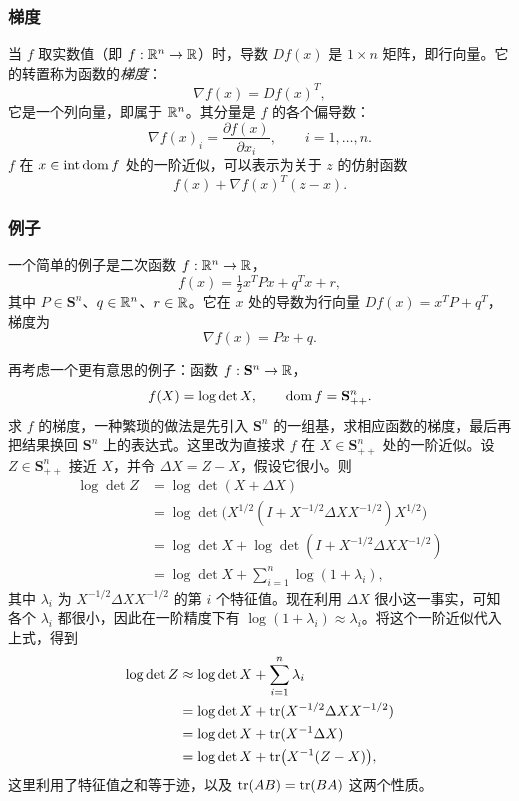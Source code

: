 \subsubsection*{梯度}
当 $f$ 取实数值（即 $f:\mathbb R^n\to\mathbb R$）时，导数 $Df(x)$ 是 $1\times n$ 矩阵，即行向量。它的转置称为函数的\emph{梯度}：
\[
 \nabla f(x)=Df(x)^T,
\]
它是一个列向量，即属于 $\mathbb R^n$。其分量是 $f$ 的各个偏导数：
\[
 \nabla f(x)_i=\frac{\partial f(x)}{\partial x_i},\qquad i=1,\ldots,n.
\]
$f$ 在 $x\in\operatorname{int}\operatorname{dom} f$ 处的一阶近似，可以表示为关于 $z$ 的仿射函数
\[
 f(x)+\nabla f(x)^T(z-x).
\]

\subsubsection*{例子}
一个简单的例子是二次函数 $f:\mathbb R^n\to\mathbb R$，
\[
 f(x)=\tfrac12x^TPx+q^Tx+r,
\]
其中 $P\in\mathbf S^n$、$q\in\mathbb R^n$、$r\in\mathbb R$。它在 $x$ 处的导数为行向量 $Df(x)=x^TP+q^T$，梯度为
\[
 \nabla f(x)=Px+q.
\]

再考虑一个更有意思的例子：函数 $f:\mathbf S^n\to\mathbb R$，
\[
 f(X)=\log\det X,\qquad\operatorname{dom} f=\mathbf S_{++}^n.
\]
求 $f$ 的梯度，一种繁琐的做法是先引入 $\mathbf S^n$ 的一组基，求相应函数的梯度，最后再把结果换回 $\mathbf S^n$ 上的表达式。这里改为直接求 $f$ 在 $X\in\mathbf S_{++}^n$ 处的一阶近似。设 $Z\in\mathbf S_{++}^n$ 接近 $X$，并令 $\Delta X=Z-X$，假设它很小。则
\begin{align*}
 \log\det Z
 &=\log\det(X+\Delta X)\\
 &=\log\det\bigl(X^{1/2}(I+X^{-1/2}\Delta XX^{-1/2})X^{1/2}\bigr)\\
 &=\log\det X+\log\det(I+X^{-1/2}\Delta XX^{-1/2})\\
 &=\log\det X+\sum_{i=1}^n\log(1+\lambda_i),
\end{align*}
其中 $\lambda_i$ 为 $X^{-1/2}\Delta XX^{-1/2}$ 的第 $i$ 个特征值。现在利用 $\Delta X$ 很小这一事实，可知各个 $\lambda_i$ 都很小，因此在一阶精度下有 $\log(1+\lambda_i)\approx\lambda_i$。将这个一阶近似代入上式，得到
\begin{align*}
 \log\det Z
 &\approx\log\det X+\sum_{i=1}^n\lambda_i\\
 &=\log\det X+\operatorname{tr}(X^{-1/2}\Delta XX^{-1/2})\\
 &=\log\det X+\operatorname{tr}(X^{-1}\Delta X)\\
 &=\log\det X+\operatorname{tr}\bigl(X^{-1}(Z-X)\bigr),
\end{align*}
这里利用了特征值之和等于迹，以及 $\operatorname{tr}(AB)=\operatorname{tr}(BA)$ 这两个性质。

